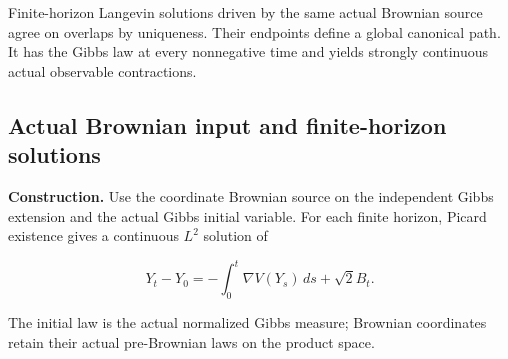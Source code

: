 \documentclass[11pt,a4paper]{report}
\begin{document}
Finite-horizon Langevin solutions driven by the same actual Brownian source agree on overlaps by uniqueness. Their endpoints define a global canonical path. It has the Gibbs law at every nonnegative time and yields strongly continuous actual observable contractions.

\subsection{\texorpdfstring{Actual Brownian input and finite-horizon solutions}{Actual Brownian input and finite-horizon solutions}}
\label{report-step-WassersteinMixing-SemigroupGlobal-lean-1}


\textbf{Construction.} Use the coordinate Brownian source on the independent Gibbs extension and the actual Gibbs initial variable. For each finite horizon, Picard existence gives a continuous \(L^2\) solution of

\[Y_t-Y_0=-\int_0^t\nabla V(Y_s)\,ds+\sqrt2 B_t.\]

The initial law is the actual normalized Gibbs measure; Brownian coordinates retain their actual pre-Brownian laws on the product space.
\end{document}
